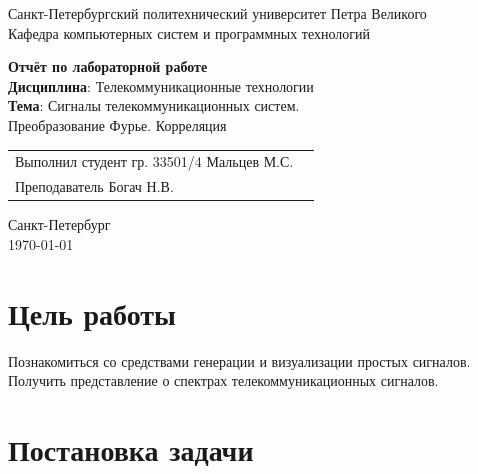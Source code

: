 \documentclass[a4paper,14pt]{extarticle}
\begin{document}
\begin{titlepage}
\centering
Санкт-Петербургский политехнический университет Петра Великого \\
\vspace{0.15cm}
Кафедра компьютерных систем и программных технологий \\
\vspace{6.5cm}

{\centering \textbf{Отчёт по лабораторной работе} \\ 
\vspace{0.15cm}
\textbf{Дисциплина}: Телекоммуникационные технологии \\
\vspace{0.15cm}
\textbf{Тема}: Сигналы телекоммуникационных
систем.\\ Преобразование
Фурье. Корреляция} \\


\vspace{6.5cm}

\begin{table}[H]
\begin{tabular}{p{\textwidth}@{}r}
{Выполнил студент гр. 33501/4} \hfill {Мальцев  М.С.} \\
{Преподаватель} \hfill {Богач Н.В.} \\
\end{tabular}
\end{table}
\vfill

{\centering Санкт-Петербург \\ 
\vspace{0.15cm}
\today}
\end{titlepage}

\tableofcontents
\newpage

\section{Цель работы}

Познакомиться со средствами генерации и визуализации простых сигналов. Получить представление о спектрах телекоммуникационных
сигналов.

\section{Постановка задачи}
\end{document}
